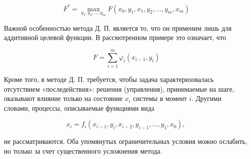 \documentclass[10pt]{article}
\begin{document}
\[

F^{*}=\max _{y_{1}, y_{2}, \ldots, y_{m}} F\left(x_{0}, y_{1}, x_{1}, y_{2}, \ldots, y_{m}, x_{m}\right)

\]



Важной особенностью метода Д. П. является то, что он применим лишь для аддитивной целевой функции. В рассмотренном примере это означает, что



\[

F=\sum_{i=1}^{m} \varphi_{i}\left(x_{i-1}, y_{i}\right)

\]



Кроме того, в методе Д. П. требуется, чтобы задача характеризовалась отсутствием «последействия»: решения (управления), принимаемые на шаге, оказывают влияние только на состояние $x_{i}$ системы в момент $i$. Другими словами, процессы, описываемые функциями вида



\[

x_{i}=f_{i}\left(x_{i-1}, y_{i}, x_{i-2}, y_{i-1}, \ldots, y_{1}, x_{0}\right) \text {, }

\]



не рассматриваются. Оба упомянутых ограничительных условия можно ослабить, но только за счет существенного усложнения метода.
\end{document}
